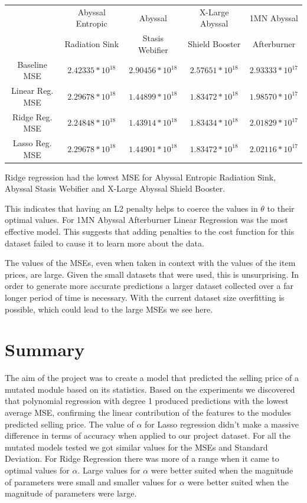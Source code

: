 \documentclass[10pt]{article}
\begin{document}
		\medskip
		
		\begin{tabular}{|c|c|c|c|c|}
			\hline
			& Abyssal Entropic & Abyssal & X-Large Abyssal & 1MN Abyssal\\
			& Radiation Sink & Stasis Webifier & Shield Booster & Afterburner\\
			\hline
			Baseline MSE & $2.42335*10^{18}$ & $2.90456*10^{18}$ & $2.57651*10^{18}$ & $2.93333*10^{17}$\\
			Linear Reg. MSE & $2.29678*10^{18}$ & $1.44899*10^{18}$ & $1.83472*10^{18}$ & $1.98570*10^{17}$\\
			Ridge Reg. MSE & $2.24848*10^{18}$ & $1.43914*10^{18}$ & $1.83434*10^{18}$ & $2.01829*10^{17}$\\
			Lasso Reg. MSE & $2.29678*10^{18}$ & $1.44901*10^{18}$ & $1.83472*10^{18}$ & $2.02116*10^{17}$\\
			\hline
		\end{tabular}
	
		\medskip
	
		Ridge regression had the lowest MSE for Abyssal Entropic Radiation Sink, Abyssal Stasis Webifier and X-Large Abyssal Shield Booster.
		
		This indicates that having an L2 penalty helps to coerce the values in $\theta$ to their optimal values. For 1MN Abyssal Afterburner Linear Regression was the most effective model. This suggests that adding penalties to the cost function for this dataset failed to cause it to learn more about the data.
		
		The values of the MSEs, even when taken in context with the values of the item prices, are large. Given the small datasets that were used, this is unsurprising. In order to generate more accurate predictions a larger dataset collected over a far longer period of time is necessary. With the current dataset size overfitting is possible, which could lead to the large MSEs we see here.
		
\section{Summary}
	The aim of the project was to create a model that predicted the selling price of a mutated module based on its statistics. Based on the experiments we discovered that polynomial regression with degree 1 produced predictions with the lowest average MSE, confirming the linear contribution of the features to the modules predicted selling price. The value of $\alpha$ for Lasso regression didn’t make a massive difference in terms of accuracy when applied to our project dataset. For all the mutated models tested we got similar values for the MSEs and Standard Deviation. For Ridge Regression there was more of a range when it came to optimal values for $\alpha$. Large values for $\alpha$ were better suited when the magnitude of parameters were small and smaller values for $\alpha$ were better suited when the magnitude of parameters were large. 
	
\end{document}
